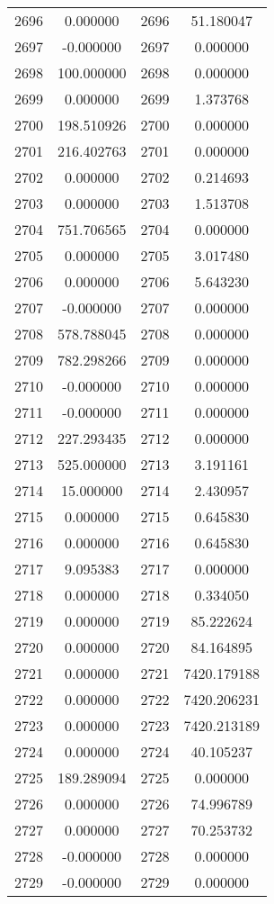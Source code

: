 \documentclass[12pt]{article}
\begin{document}
\begin{longtable}{@{}cccc@{}}
2696 & 0.000000 & 2696 & 51.180047 \\
2697 & -0.000000 & 2697 & 0.000000 \\
2698 & 100.000000 & 2698 & 0.000000 \\
2699 & 0.000000 & 2699 & 1.373768 \\
2700 & 198.510926 & 2700 & 0.000000 \\
2701 & 216.402763 & 2701 & 0.000000 \\
2702 & 0.000000 & 2702 & 0.214693 \\
2703 & 0.000000 & 2703 & 1.513708 \\
2704 & 751.706565 & 2704 & 0.000000 \\
2705 & 0.000000 & 2705 & 3.017480 \\
2706 & 0.000000 & 2706 & 5.643230 \\
2707 & -0.000000 & 2707 & 0.000000 \\
2708 & 578.788045 & 2708 & 0.000000 \\
2709 & 782.298266 & 2709 & 0.000000 \\
2710 & -0.000000 & 2710 & 0.000000 \\
2711 & -0.000000 & 2711 & 0.000000 \\
2712 & 227.293435 & 2712 & 0.000000 \\
2713 & 525.000000 & 2713 & 3.191161 \\
2714 & 15.000000 & 2714 & 2.430957 \\
2715 & 0.000000 & 2715 & 0.645830 \\
2716 & 0.000000 & 2716 & 0.645830 \\
2717 & 9.095383 & 2717 & 0.000000 \\
2718 & 0.000000 & 2718 & 0.334050 \\
2719 & 0.000000 & 2719 & 85.222624 \\
2720 & 0.000000 & 2720 & 84.164895 \\
2721 & 0.000000 & 2721 & 7420.179188 \\
2722 & 0.000000 & 2722 & 7420.206231 \\
2723 & 0.000000 & 2723 & 7420.213189 \\
2724 & 0.000000 & 2724 & 40.105237 \\
2725 & 189.289094 & 2725 & 0.000000 \\
2726 & 0.000000 & 2726 & 74.996789 \\
2727 & 0.000000 & 2727 & 70.253732 \\
2728 & -0.000000 & 2728 & 0.000000 \\
2729 & -0.000000 & 2729 & 0.000000 \\

\end{longtable}
\end{document}
